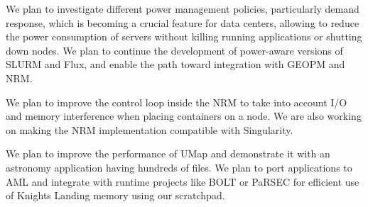 We plan to investigate different power management policies,
particularly demand response, which is becoming a crucial feature for
data centers, allowing to reduce the power consumption of servers
without killing running applications or shutting down nodes.
We plan to continue the 
development of power-aware versions of SLURM and Flux, and enable the path toward  
integration with GEOPM and NRM. 

We plan to improve the control loop inside the NRM to take into account I/O and
memory interference when placing containers on a node. We are also working on
making the NRM implementation compatible with Singularity.

We plan to improve the performance of UMap and demonstrate it with an
astronomy application having hundreds of files.
%
We plan to port applications to AML and integrate with runtime projects like
BOLT or PaRSEC for efficient use of Knights Landing memory using our
scratchpad.
